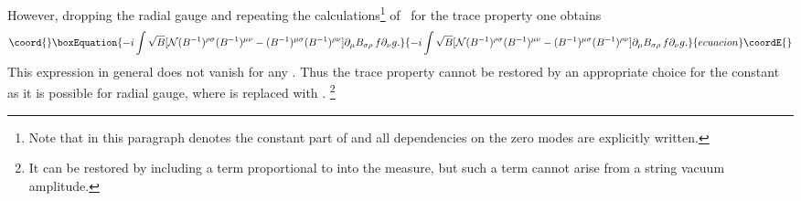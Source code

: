 \documentclass[a4paper,12pt]{article}
\providecommand {\cN}{{\cal N}}
\begin{document}
However, dropping the radial gauge and repeating the 
calculations\footnote{Note that in this paragraph \coordHE{} denotes 
the constant part of \coordHE{} and all dependencies on the zero 
modes are explicitly written.}  
of~\cite{Cornalba:2001sm} for the trace property one obtains
\begin{equation}\coord{}\boxEquation{
  \label{eq:NoRadGauge}
  -i\int \sqrt{B}[\cN (B^{-1})^{\rho\sigma}(B^{-1})^{\mu\nu} 
  -(B^{-1})^{\mu\sigma}(B^{-1})^{\rho\nu}]
   \partial_\mu B_{\sigma\rho}\,f\partial_\nu g.
}{
  -i\int \sqrt{B}[\cN (B^{-1})^{\rho\sigma}(B^{-1})^{\mu\nu} 
  -(B^{-1})^{\mu\sigma}(B^{-1})^{\rho\nu}]
   \partial_\mu B_{\sigma\rho}\,f\partial_\nu g.
}{ecuacion}\coordE{}\end{equation}
This expression in general does not vanish for any \myHighlight{$\cN$}\coordHE{}. Thus the trace 
property cannot be restored by an appropriate choice for the constant \myHighlight{$\cN$}\coordHE{} 
as it is possible for radial gauge, where \coordHE{} 
is replaced with \coordHE{}.%
\footnote{It can be restored by including a term proportional to \coordHE{} into the
measure, but such a term cannot arise from a string vacuum amplitude.}
\end{document}
